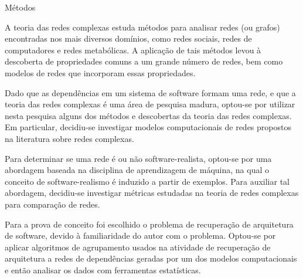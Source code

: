 \begin{section}{Métodos}
	
	A teoria das redes complexas estuda métodos para analisar redes (ou grafos) encontradas nos mais diversos domínios, como redes sociais, redes de computadores e redes metabólicas. A aplicação de tais métodos levou à descoberta de propriedades comuns a um grande número de redes, bem como modelos de redes que incorporam essas propriedades.
	
	Dado que as dependências em um sistema de software formam uma rede, e que a teoria das redes complexas é uma área de pesquisa madura, optou-se por utilizar nesta pesquisa alguns dos métodos e descobertas da teoria das redes complexas. Em particular, decidiu-se investigar modelos computacionais de redes propostos na literatura sobre redes complexas.

	Para determinar se uma rede é ou não software-realista, optou-se por uma abordagem baseada na disciplina de aprendizagem de máquina, na qual o conceito de software-realismo é induzido a partir de exemplos. Para auxiliar tal abordagem, decidiu-se investigar métricas estudadas na teoria de redes complexas para comparação de redes.
	
	
	Para a prova de conceito foi escolhido o problema de recuperação de arquitetura de software, devido à familiaridade do autor com o problema. Optou-se por aplicar algoritmos de agrupamento usados na atividade de recuperação de arquitetura a redes de dependências geradas por um dos modelos computacionais e então analisar os dados com ferramentas estatísticas.

\end{section}


